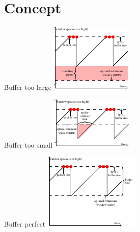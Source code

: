 \documentclass[xcolor={dvipsnames}]{beamer}
\begin{document}
\section{Concept}

\begin{frame}{Buffer too large}
            \centering
  \includegraphics[height=0.9\textheight,keepaspectratio]{figures/cocoa_illustration_too_much.pdf}
\end{frame}

\begin{frame}{Buffer too small}
            \centering
  \includegraphics[height=0.9\textheight,keepaspectratio]{figures/cocoa_illustration_too_little.pdf}
\end{frame}

\begin{frame}{Buffer perfect}
            \centering
  \includegraphics[height=0.9\textheight,keepaspectratio]{figures/cocoa_illustration_perfect.pdf}
\end{frame}

\end{document}
